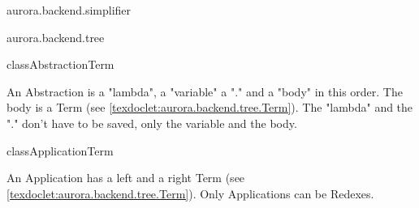 \begin{texdocpackage}{aurora.backend.simplifier}
\end{texdocpackage}



\begin{texdocpackage}{aurora.backend.tree}
\label{texdoclet:aurora.backend.tree}

\begin{texdocclass}{class}{Abstraction}{Term}{}
\label{texdoclet:aurora.backend.tree.Abstraction}
\begin{texdocclassintro}
An Abstraction is a "lambda", a "variable" a "." and a "body" in this order.
 The body is a Term (see \ref{texdoclet:aurora.backend.tree.Term}).
 The "lambda" and the "." don't have to be saved, only the variable and the body.\end{texdocclassintro}
\begin{texdocclassfields}
\end{texdocclassfields}
\begin{texdocclassconstructors}
\end{texdocclassconstructors}
\begin{texdocclassmethods}
\end{texdocclassmethods}
\end{texdocclass}


\begin{texdocclass}{class}{Application}{Term}{}
\label{texdoclet:aurora.backend.tree.Application}
\begin{texdocclassintro}
An Application has a left and a right Term (see \ref{texdoclet:aurora.backend.tree.Term}).
 Only Applications can be Redexes.\end{texdocclassintro}
\begin{texdocclassfields}
\end{texdocclassfields}
\begin{texdocclassconstructors}
\end{texdocclassconstructors}
\begin{texdocclassmethods}
\end{texdocclassmethods}
\end{texdocclass}



\end{texdocpackage}
